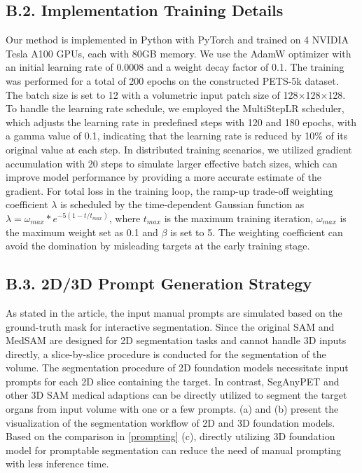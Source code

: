 \subsection*{B.2. Implementation Training Details}


Our method is implemented in Python with PyTorch and trained on 4 NVIDIA Tesla A100 GPUs, each with 80GB memory. 
We use the AdamW optimizer with an initial learning rate of 0.0008 and a weight decay factor of 0.1.
The training was performed for a total of 200 epochs on the constructed PETS-5k dataset.
The batch size is set to 12 with a volumetric input patch size of 128$\times$128$\times$128. 
To handle the learning rate schedule, we employed the MultiStepLR scheduler, which adjusts the learning rate in predefined steps with 120 and 180 epochs, with a gamma value of 0.1, indicating that the learning rate is reduced by 10\% of its original value at each step.
In distributed training scenarios, we utilized gradient accumulation with 20 steps to simulate larger effective batch sizes, which can improve model performance by providing a more accurate estimate of the gradient.
For total loss in the training loop, the ramp-up trade-off weighting coefficient $\lambda$ is scheduled by the time-dependent Gaussian function as $ \lambda=\omega_{max}*e^{-5(1-t/t_{max})}$, where $t_{max}$ is the maximum training iteration, $\omega_{max}$ is the maximum weight set as 0.1 and $\beta$ is set to 5.
The weighting coefficient can avoid the domination by misleading targets at the early training stage.

\subsection*{B.3. 2D/3D Prompt Generation Strategy}

As stated in the article, the input manual prompts are simulated based on the ground-truth mask for interactive segmentation.
Since the original SAM \cite{SAM} and MedSAM \cite{MedSAM} are designed for 2D segmentation tasks and cannot handle 3D inputs directly, a slice-by-slice procedure is conducted for the segmentation of the volume. The segmentation procedure of 2D foundation models necessitate input prompts for each 2D slice containing the target.
In contrast, SegAnyPET and other 3D SAM medical adaptions \cite{SAM-Med3D} can be directly utilized to segment the target organs from input volume with one or a few prompts. 
 (a) and (b) present the visualization of the segmentation workflow of 2D and 3D foundation models. Based on the comparison in \cref{prompting} (c), directly utilizing 3D foundation model for promptable segmentation can reduce the need of manual prompting with less inference time.


